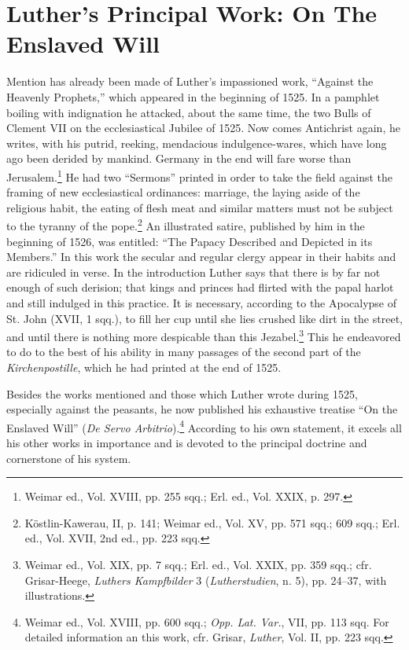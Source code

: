 \section{Luther’s Principal Work: On The Enslaved Will}

Mention has already been made of Luther’s impassioned work,
“Against the Heavenly Prophets,” which appeared in the beginning
of 1525. In a pamphlet boiling with indignation he attacked, about
the same time, the two Bulls of Clement VII on the ecclesiastical
Jubilee of 1525. Now comes Antichrist again, he writes, with his
putrid, reeking, mendacious indulgence-wares, which have long ago
been derided by mankind. Germany in the end will fare worse
than Jerusalem.\footnote{Weimar ed., Vol. XVIII, pp. 255 sqq.; Erl. ed., Vol. XXIX, p. 297.}
He had two “Sermons” printed in order to take the
field against the framing of new ecclesiastical ordinances: marriage,
the laying aside of the religious habit, the eating of flesh meat and
similar matters must not be subject to the tyranny of the pope.\footnote
{Köstlin-Kawerau, II, p. 141; Weimar ed., Vol. XV, pp. 571 sqq.; 609 sqq.; Erl. ed.,
Vol. XVII, 2nd ed., pp. 223 sqq.}
An illustrated satire, published by him in the beginning of 1526,
was entitled: “The Papacy Described and Depicted in its Members.”
In this work the secular and regular clergy appear in their habits
and are ridiculed in verse. In the introduction Luther says that there
is by far not enough of such derision; that kings and princes had
flirted with the papal harlot and still indulged in this practice. It
is necessary, according to the Apocalypse of St. John (XVII, 1 sqq.),
to fill her cup until she lies crushed like dirt in the street, and until
there is nothing more despicable than this Jezabel.\footnote
{Weimar ed., Vol. XIX, pp. 7 sqq.; Erl. ed., Vol. XXIX, pp. 359 sqq.; cfr. Grisar-Heege,
\textit{Luthers Kampfbilder} 3 (\textit{Lutherstudien}, n. 5), pp. 24--37, with illustrations.}
This he endeavored to do to the best of his ability in many passages of the
second part of the \textit{Kirchenpostille}, which he had printed at the
end of 1525.

Besides the works mentioned and those which Luther wrote during 1525,
especially against the peasants, he now published his exhaustive
treatise “On the Enslaved Will” (\textit{De Servo Arbitrio}).\footnote
{Weimar ed., Vol. XVIII, pp. 600 sqq.; \textit{Opp. Lat. Var.}, VII, pp. 113 sqq. For detailed
information an this work, cfr. Grisar, \textit{Luther}, Vol. II, pp. 223 sqq.}
According to his own statement, it excels all his other works in
importance and is devoted to the principal doctrine and cornerstone
of his system.

